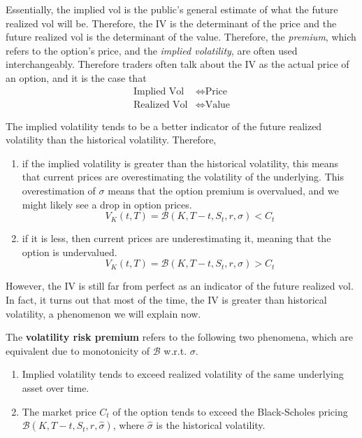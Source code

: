 \documentclass{article}
\begin{document}
    Essentially, the implied vol is the public's general estimate of what the future realized vol will be. Therefore, the IV is the determinant of the price and the future realized vol is the determinant of the value. Therefore, the \textit{premium}, which refers to the option's price, and the \textit{implied volatility}, are often used interchangeably. Therefore traders often talk about the IV as the actual price of an option, and it is the case that 
    \begin{align*}
      \text{Implied Vol} & \iff  \text{Price} \\ 
      \text{Realized Vol} & \iff \text{Value}
    \end{align*}
  
    The implied volatility tends to be a better indicator of the future realized volatility than the historical volatility. Therefore, 
    \begin{enumerate}
      \item if the implied volatility is greater than the historical volatility, this means that current prices are overestimating the volatility of the underlying. This overestimation of $\sigma$ means that the option premium is overvalued, and we might likely see a drop in option prices. 
      \begin{equation}
        V_K (t, T) = \mathcal{B} (K, T - t, S_t, r, \sigma) < C_t
      \end{equation}

      \item if it is less, then current prices are underestimating it, meaning that the option is undervalued. 
      \begin{equation}
        V_K (t, T) = \mathcal{B} (K, T - t, S_t, r, \sigma) > C_t
      \end{equation}
    \end{enumerate}
    However, the IV is still far from perfect as an indicator of the future realized vol. In fact, it turns out that most of the time, the IV is greater than historical volatility, a phenomenon we will explain now. 

    \begin{theorem}
      The \textbf{volatility risk premium} refers to the following two phenomena, which are equivalent due to monotonicity of $\mathcal{B}$ w.r.t. $\sigma$. 
      \begin{enumerate}
        \item Implied volatility tends to exceed realized volatility of the same underlying asset over time. 
        \item The market price $C_t$ of the option tends to exceed the Black-Scholes pricing $\mathcal{B}(K, T - t, S_t, r, \hat{\sigma})$, where $\hat{\sigma}$ is the historical volatility. 
      \end{enumerate}
    \end{theorem}
\end{document}
